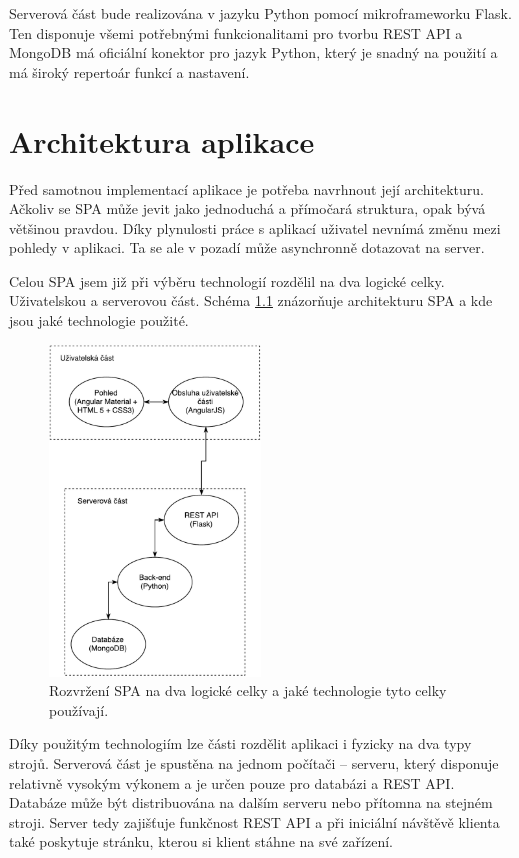 Serverová část bude realizována v jazyku Python pomocí mikroframeworku Flask. Ten disponuje všemi potřebnými funkcionalitami pro tvorbu REST API a MongoDB má oficiální konektor pro jazyk Python, který je snadný na použití a má široký repertoár funkcí a nastavení.

\chapter{Architektura aplikace}
\label{architektura}

Před samotnou implementací aplikace je potřeba navrhnout její architekturu. Ačkoliv se SPA může jevit jako jednoduchá a přímočará struktura, opak bývá většinou pravdou. Díky plynulosti práce s aplikací uživatel nevnímá změnu mezi pohledy v aplikaci. Ta se ale v pozadí může asynchronně dotazovat na server.

Celou SPA jsem již při výběru technologií rozdělil na dva logické celky. Uživatelskou a serverovou část. Schéma \ref{fig:system} znázorňuje architekturu SPA a kde jsou jaké technologie použité.

\begin{figure}[h]
    \centering
    \includegraphics[width=0.5\textwidth]{fig/SPA.pdf}
    \caption{Rozvržení SPA na dva logické celky a jaké technologie tyto celky používají.} \label{fig:system}
\end{figure}

Díky použitým technologiím lze části rozdělit aplikaci i fyzicky na dva typy strojů. Serverová část je spustěna na jednom počítači -- serveru, který disponuje relativně vysokým výkonem a je určen pouze pro databázi a REST API. Databáze může být distribuována na dalším serveru nebo přítomna na stejném stroji. Server tedy zajišťuje funkčnost REST API a při iniciální návštěvě klienta také poskytuje stránku, kterou si klient stáhne na své zařízení.

